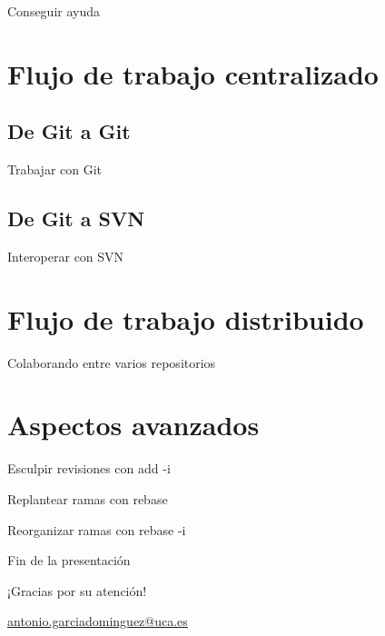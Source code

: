 \documentclass[compress,xcolor=svgnames]{beamer}
\begin{document}
\begin{frame}{Conseguir ayuda}

\end{frame}

\section[Centralizado]{Flujo de trabajo centralizado}

\subsection{De Git a Git}

\begin{frame}{Trabajar con Git}

\end{frame}

\subsection{De Git a SVN}

\begin{frame}{Interoperar con SVN}

\end{frame}

\section[Distribuido]{Flujo de trabajo distribuido}

\begin{frame}{Colaborando entre varios repositorios}

\end{frame}

\section[Avanzado]{Aspectos avanzados}

\begin{frame}{Esculpir revisiones con add -i}

\end{frame}

\begin{frame}{Replantear ramas con rebase}

\end{frame}

\begin{frame}{Reorganizar ramas con rebase -i}

\end{frame}

\appendix

\begin{frame}{Fin de la presentación}
  \begin{center}
    {\Huge ¡Gracias por su atención!}

    \vspace{3em}

    {\Large
      \href{mailto:antonio.garciadominguez@uca.es}{antonio.garciadominguez@uca.es}}
  \end{center}
\end{frame}
\end{document}
